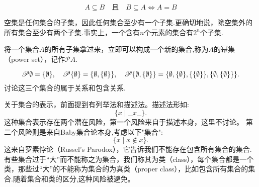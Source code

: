 \begin{example}
    \[A\subseteq B \quad\textit{且}\quad B\subseteq A\iff A=B\]
\end{example}

空集是任何集合的子集，因此任何集合至少有一个子集.更确切地说，除空集外的所有集合至少有两个子集.事实上，一个含有$n$个元素的集合有$2^n$个子集.

将一个集合$A$的所有子集拿过来，立即可以构成一个新的集合,称为$A$的幂集（power set），记作$\mathscr{P}A$.

\begin{example}
    \[\mathscr{P}\emptyset=\{\emptyset\},\quad
    \mathscr{P}\{\emptyset\}=\{\emptyset,\{\emptyset\}\},\quad
    \mathscr{P}\{\emptyset,\{\emptyset\}\}=\{\emptyset,\{\emptyset\},\{\{\emptyset\}\},\{\emptyset,\{\emptyset\}\}\}.\]
    讨论这三个集合的属于关系和包含关系.
\end{example}

关于集合的表示，前面提到有列举法和描述法。描述法形如:
\[\{x\mid\_\_x\_\_\}.\]
这种集合表示存在两个潜在风险，第一个风险来自于描述本身，这里不讨论。
第二个风险则是来自Baby集合论本身,考虑以下"集合":
\[\{x\mid x\notin x\}.\]
这来自罗素悖论（Russel's Parodox），它告诉我们不能存在包含所有集合的集合.有些集合过于“大”而不能称之为集合，我们称其为类（class），每个集合都是一个类，那些过“大”的不能称为集合的为真类（proper class），比如包含所有集合的集合.随着集合和类的区分,这种风险被避免。